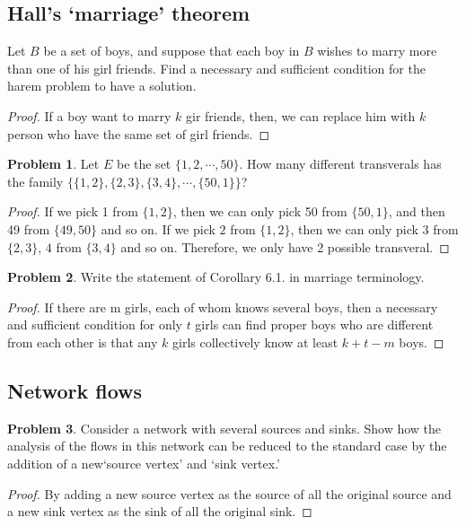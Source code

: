 \documentclass[a4paper,11pt]{article}%
\theoremstyle{remark}
\theoremstyle{definition}
\newtheorem{problem}{Problem}[subsection]
\begin{document}
\subsection{Hall's `marriage' theorem}
Let $B$ be a set of boys, and suppose that each boy in $B$ wishes to marry more than one of his girl friends. Find a necessary and sufficient 
condition for the harem problem to have a solution.
\begin{proof}
    If a boy want to marry $k$ gir friends, then, we can replace him with $k$ person who have the same set of girl friends.
\end{proof}
\begin{problem}
    Let $E$ be the set $\{1,2,\cdots,50\}$. How many different transverals has the family $\{\{1,2\},\{2,3\},\{3,4\},\cdots,\{50,1\}\}$?
\begin{proof}
   If we pick 1 from $\{1,2\}$, then we can only pick 50 from $\{50,1\}$, and then 49 from $\{49,50\}$ and so on. 
   If we pick $2$ from $\{1,2\}$, then we can only pick $3$ from $\{2,3\}$, $4$ from $\{3,4\}$ and so on.
   Therefore, we only have 2 possible transveral.
\end{proof}
\end{problem}
\begin{problem}
    Write the statement of Corollary 6.1. in marriage terminology.
    \begin{proof}
       If there are m girls, each of whom knows several boys, then a necessary and sufficient condition for 
       only $t$ girls can find proper boys who are different from each other is that any $k$ girls collectively know 
       at least $k+t-m$ boys.
    \end{proof}
\end{problem}
\subsection{Network flows}
\begin{problem}
    Consider a network with several sources and sinks. Show how the analysis of the flows in this network can be reduced to the 
    standard case by the addition of a new`source vertex' and `sink vertex.'
\end{problem}
\begin{proof}
    By adding a new source vertex as the source of all the original source and a new sink vertex as the sink of all the original sink.
\end{proof}
\end{document}
